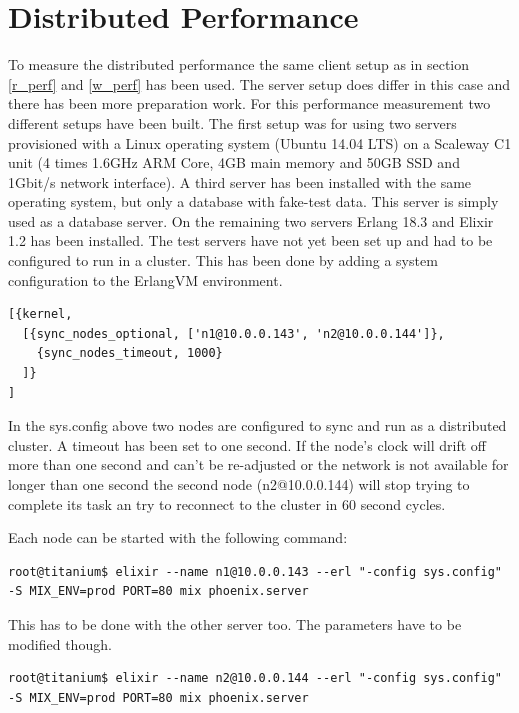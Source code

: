 \section{Distributed Performance}\label{d_perf}
{\color{newcode}To measure the distributed performance the same client setup as in section \ref{r_perf} and \ref{w_perf} has been used. The server setup does differ in this case and there has been more preparation work. 
For this performance measurement two different setups have been built. The first setup was for using two servers provisioned with a Linux operating system (Ubuntu 14.04 LTS) on a Scaleway C1 unit (4 times 1.6GHz ARM Core, 4GB main memory and 50GB SSD and 1Gbit/s network interface). A third server has been installed with the same operating system, but only a database with fake-test data. This server is simply used as a database server. On the remaining two servers Erlang 18.3 and Elixir 1.2 has been installed. The test servers have not yet been set up and had to be configured to run in a cluster. This has been done by adding a system configuration to the ErlangVM environment.

\begin{lstlisting}[caption={sys.config},label=lst:nodecondig]
[{kernel,
  [{sync_nodes_optional, ['n1@10.0.0.143', 'n2@10.0.0.144']},
    {sync_nodes_timeout, 1000}
  ]}
]
\end{lstlisting}

In the sys.config above two nodes are configured to sync and run as a distributed cluster. A timeout has been set to one second. If the node's clock will drift off more than one second and can't be re-adjusted or the network is not available for longer than one second the second node (n2@10.0.0.144) will stop trying to complete its task an try to reconnect to the cluster in 60 second cycles. 

Each node can be started with the following command:

\begin{lstlisting}
root@titanium$ elixir --name n1@10.0.0.143 --erl "-config sys.config" -S MIX_ENV=prod PORT=80 mix phoenix.server
\end{lstlisting}


This has to be done with the other server too. The parameters have to be modified though.

\begin{lstlisting}
root@titanium$ elixir --name n2@10.0.0.144 --erl "-config sys.config" -S MIX_ENV=prod PORT=80 mix phoenix.server
\end{lstlisting}

}

